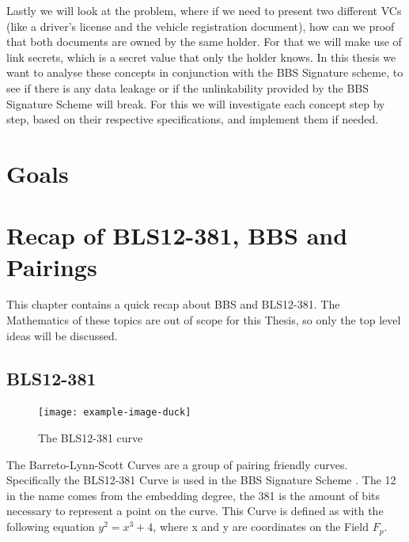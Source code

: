 \documentclass[
	a4paper               %
	,bibliography=totoc   %
	,listof=totoc         %
	,monolingual
	twoside=false,
]{bfhthesis}              %
\begin{document}
Lastly we will look at the problem, where if we need to present two different VCs (like a driver's license and the vehicle registration document), how can we proof that both documents are owned by the same holder.
For that we will make use of link secrets\cite{linksecrets}, which is a secret value that only the holder knows.
In this thesis we want to analyse these concepts in conjunction with the BBS Signature scheme, to see if there is any data leakage or if the unlinkability provided by the BBS Signature Scheme will break.
For this we will investigate each concept step by step, based on their respective specifications, and implement them if needed.

\chapter{Goals}

\chapter{Recap of BLS12-381, BBS and Pairings}
This chapter contains a quick recap about BBS and BLS12-381.
The Mathematics of these topics are out of scope for this Thesis, so only the top level ideas will be discussed.

\section{BLS12-381}
\begin{figure}[h]
    \centering
	\texttt{[image: example-image-duck]}
	\caption{The BLS12-381 curve}
	\label{fig:bls12381}
\end{figure}
The Barreto-Lynn-Scott Curves \cite{pairing-friendly-curves} are a group of pairing friendly curves. 
Specifically the BLS12-381 Curve is used in the BBS Signature Scheme \cite{bbs-signature-scheme}.
The 12 in the name comes from the embedding degree, the 381 is the amount of bits necessary to represent a point on the curve.
This Curve is defined as with the following equation $y^2 = x^3 + 4$, where x and y are coordinates on the Field $F_p$.
\end{document}

